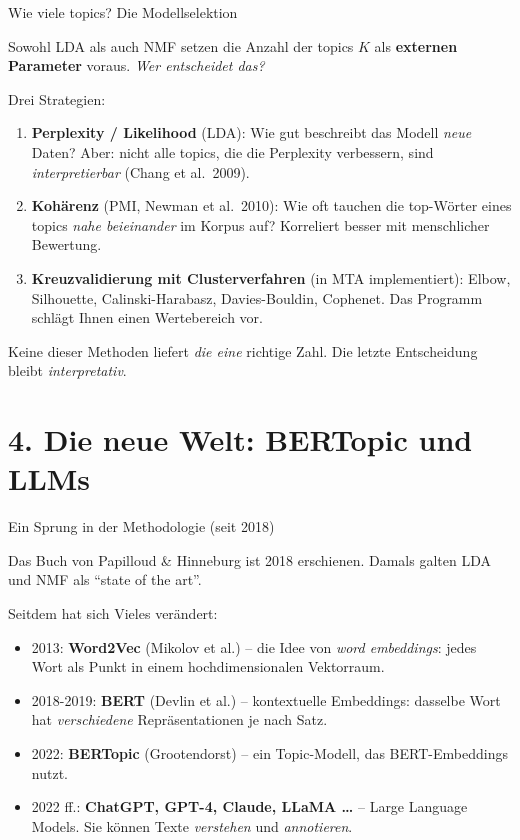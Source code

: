 \documentclass[aspectratio=169,11pt]{beamer}
\let\oldemph\emph
\renewcommand{\emph}[1]{{\color{solCyan}\oldemph{#1}}}
\let\oldtextbf\textbf
\renewcommand{\textbf}[1]{{\color{solBase3}\oldtextbf{#1}}}
\begin{document}
\begin{frame}{Wie viele topics? Die Modellselektion}

  Sowohl LDA als auch NMF setzen die Anzahl der topics $K$ als
  \textbf{externen Parameter} voraus. \emph{Wer entscheidet das?}

  \vfill
  Drei Strategien:
  \begin{enumerate}
    \item \textbf{Perplexity / Likelihood} (LDA): Wie gut beschreibt
          das Modell \emph{neue} Daten? Aber: nicht alle topics, die
          die Perplexity verbessern, sind \emph{interpretierbar}
          (Chang et al.\ 2009).
    \vfill
    \item \textbf{Kohärenz} (PMI, Newman et al.\ 2010): Wie oft tauchen
          die top-Wörter eines topics \emph{nahe beieinander} im Korpus
          auf? Korreliert besser mit menschlicher Bewertung.
    \vfill
    \item \textbf{Kreuzvalidierung mit Clusterverfahren} (in MTA
          implementiert): Elbow, Silhouette, Calinski-Harabasz,
          Davies-Bouldin, Cophenet. Das Programm schlägt Ihnen einen
          Wertebereich vor.
  \end{enumerate}

  \vfill
  \footnotesize\color{black!60}
  Keine dieser Methoden liefert \emph{die eine} richtige Zahl. Die
  letzte Entscheidung bleibt \emph{interpretativ}.

\end{frame}

\section{4. Die neue Welt: BERTopic und LLMs}

\begin{frame}{Ein Sprung in der Methodologie (seit 2018)}

  Das Buch von Papilloud \& Hinneburg ist 2018 erschienen. Damals
  galten LDA und NMF als \enquote{state of the art}.

  \vfill
  Seitdem hat sich Vieles verändert:
  \begin{itemize}
    \item 2013: \textbf{Word2Vec} (Mikolov et al.) – die Idee von
          \emph{word embeddings}: jedes Wort als Punkt in einem
          hochdimensionalen Vektorraum.
    \vfill
    \item 2018-2019: \textbf{BERT} (Devlin et al.) – kontextuelle
          Embeddings: dasselbe Wort hat \emph{verschiedene}
          Repräsentationen je nach Satz.
    \vfill
    \item 2022: \textbf{BERTopic} (Grootendorst) – ein Topic-Modell,
          das BERT-Embeddings nutzt.
    \vfill
    \item 2022 ff.: \textbf{ChatGPT, GPT-4, Claude, LLaMA \ldots} –
          Large Language Models. Sie können Texte
          \emph{verstehen} und \emph{annotieren}.
  \end{itemize}

\end{frame}
\end{document}
